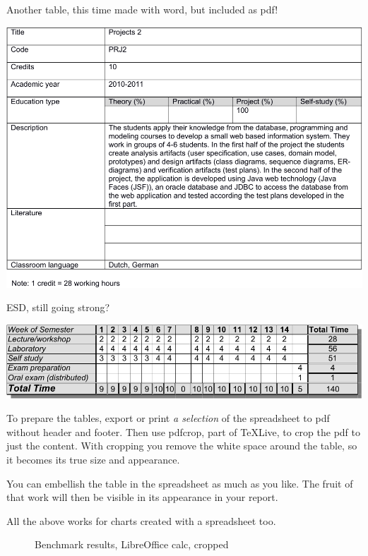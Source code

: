 \begin{table}
  \caption{Another table, this time made with word, but included as pdf!}
\includegraphics{tables/md_prj2-crop.pdf}   
\end{table}

\begin{table}
  \caption{ESD, still going strong?}
\includegraphics{tables/timetable-crop.pdf}
\end{table}


To prepare the tables, export or print \textit{a selection} of the spreadsheet to pdf without header and footer.
Then use pdfcrop, part of TeXLive, to crop the pdf to just the content. With cropping you remove the white space around the table, so it becomes its true size and appearance.

You can embellish the table in the spreadsheet as much as you like. The fruit of that work will then be visible in its appearance in your report.

All the above works for charts created with a spreadsheet too.

\begin{figure}
  \centering
{}
  \caption{Benchmark results, LibreOffice calc, cropped}
\end{figure}


